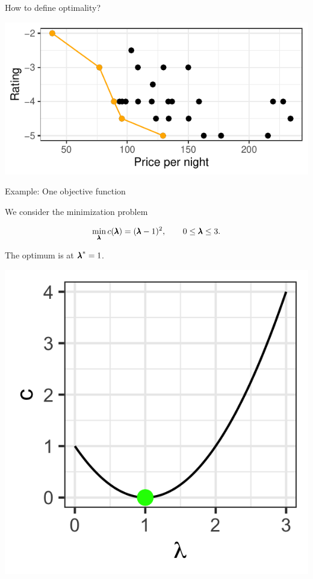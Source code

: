 \begin{frame}[allowframebreaks]{How to define optimality?}
\begin{itemize}
\vspace*{0.3cm}

\centering \includegraphics[width=0.8\linewidth]{images/expedia-5-1}

\end{itemize}

\end{frame}

\begin{frame}{Example: One objective function}


We consider the minimization problem

$$
\min_{\pmb{\lambda}} c(\pmb{\lambda}) = (\pmb{\lambda} - 1)^2, \qquad 0 \le \pmb{\lambda} \le 3.
$$

The optimum is at ${\pmb{\lambda}}^* = 1$.

\vspace*{0.1cm}


\centering \includegraphics[scale=0.2]{images/graph1}


\end{frame}

